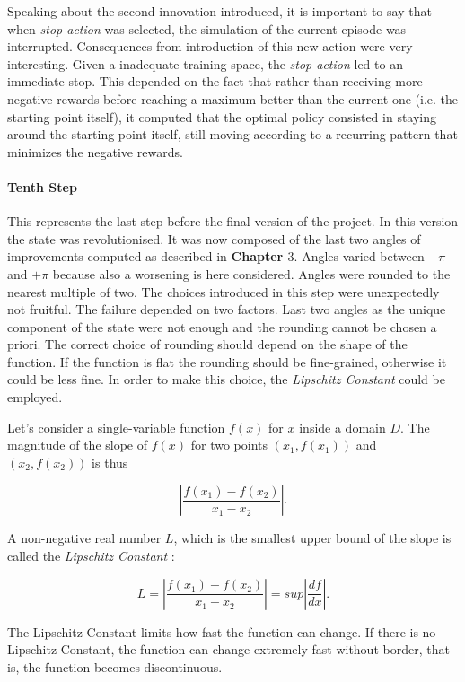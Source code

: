 Speaking about the second innovation introduced,  it is important to say that when \textit{stop action} was selected, the simulation of the current episode was interrupted. Consequences from introduction of this new action were very interesting. Given a inadequate training space, the \textit{stop action} led to an immediate stop. This depended on the fact that rather than receiving more negative rewards before reaching a maximum better than the current one (i.e. the starting point itself), it computed that the optimal policy consisted in staying around the starting point itself, still moving according to a recurring pattern that minimizes the negative rewards.

\paragraph{Tenth Step} This represents the last step before the final version of the project. In this version the state was revolutionised. It was now composed of the last two angles of improvements computed as described in \textbf{Chapter $3$}. Angles varied between $- \pi$ and $+ \pi$ because also a worsening is here considered. Angles were rounded to the nearest multiple of two. The choices introduced in this step were unexpectedly not fruitful. The failure depended on two factors. Last two angles as the unique component of the state were not enough and the rounding cannot be chosen a priori. The correct choice of rounding should depend on the shape of the function. If the function is flat the rounding should be fine-grained, otherwise it could be less fine. In order to make this choice, the \textit{Lipschitz Constant} could be employed. 

Let's consider a single-variable function $f(x)$ for $x$ inside a domain $D$. The magnitude of the slope of $f(x)$ for two points $(x_1, f(x_1))$ and $(x_2, f(x_2))$ is thus 

\begin{equation}
	|\dfrac{f(x_1)-f(x_2)}{x_1 - x_2}|.
\end{equation}

A non-negative real number $L$, which is the smallest upper bound of the slope is called the \textit{Lipschitz Constant} :

\begin{equation}
L = |\dfrac{f(x_1)-f(x_2)}{x_1 - x_2}| = sup|\dfrac{df}{dx}|.
\end{equation}

The Lipschitz Constant limits how fast the function can change. If there is no Lipschitz Constant, the function can change extremely fast without border, that is, the function becomes discontinuous\cite{Lipschitz}.

